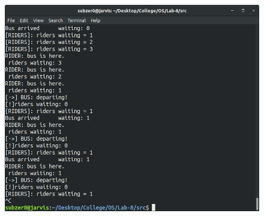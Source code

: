 \documentclass{article}
\begin{document}
\begin{figure}[h]
	\includegraphics[width=\textwidth]{output/senate.png}
\end{figure}
\bigskip
\end{document}
